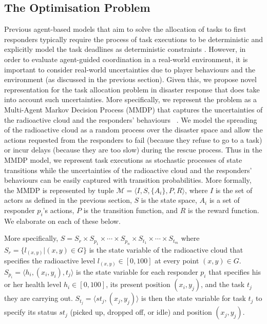 \subsection{The Optimisation Problem}
\label{sec:model}
\noindent Previous agent-based models that aim to solve the allocation of tasks to first responders typically require the process of task executions to be deterministic and explicitly model the task deadlines as deterministic constraints \cite{ramchurn:etal:2010b,Scerri2005}. However, in order to evaluate agent-guided coordination in a real-world environment, it is important to consider real-world uncertainties due to player behaviours and the environment (as discussed in the previous section). Given this, we propose novel representation for the task allocation problem in disaster response that does take into account such uncertainties. More specifically, we represent the problem as a Multi-Agent Markov Decision Process (MMDP) that captures the uncertainties of the radioactive cloud and the responders' behaviours ~\cite{boutilier1996planning}. We model the spreading of the radioactive cloud as a random process over the disaster space and allow the actions requested from the responders to  fail (because they refuse to go to a  task) or incur delays (because they are too slow) during the rescue process. Thus in the MMDP model, we represent  task executions as stochastic processes of state transitions while the uncertainties of the radioactive cloud and the responders' behaviours can be easily captured with transition probabilities.  More formally, the MMDP is
represented by tuple $\mathcal{M} = \langle I, S, \{A_i\}, P, R
\rangle$, where $I$ is the set of actors as defined in the previous
section,  $S$ is the state space, $A_i$ is a set of responder
$p_i$'s actions, $P$ is the transition function, and $R$ is the
reward function. We elaborate on each of these below.

More specifically, $S= S_r \times S_{p_1} \times \cdots \times
S_{p_n} \times S_{t_1} \times \cdots \times S_{t_m}$ where $S_r =
\{l_{(x,y)}| (x, y) \in G\}$ is the state variable of the
radioactive cloud that specifies the radioactive level $l_{(x,y)}\in[0,
100]$ at every point $(x, y)\in G$. $S_{p_i} = \langle h_i, (x_i,
y_i), t_j \rangle$ is the state variable for each responder $p_i$
that specifies his or her health level $h_i\in[0, 100]$, its present position
$(x_i, y_j)$, and the task $t_j$ they are carrying out. $S_{t_j}
= \langle st_j, (x_j, y_j) \rangle$ is then the state variable for
task $t_j$ to specify its status $st_j$ (picked up, dropped off, or
idle) and position $(x_j, y_j)$.

